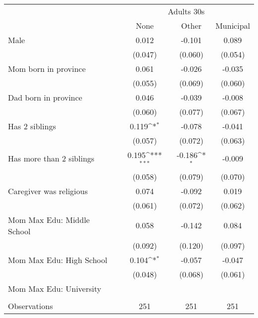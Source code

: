 {
\def\sym#1{\ifmmode^{#1}\else\(^{#1}\)\fi}
\begin{tabular}{l*{3}{c}}
\toprule
& \multicolumn{3}{c}{Adults 30s} \\
                    &\multicolumn{1}{c}{None}&\multicolumn{1}{c}{Other}&\multicolumn{1}{c}{Municipal}\\
\midrule
Male                &       0.012         &      -0.101         &       0.089         \\
                    &     (0.047)         &     (0.060)         &     (0.054)         \\
\addlinespace
Mom born in province&       0.061         &      -0.026         &      -0.035         \\
                    &     (0.055)         &     (0.069)         &     (0.060)         \\
\addlinespace
Dad born in province&       0.046         &      -0.039         &      -0.008         \\
                    &     (0.060)         &     (0.077)         &     (0.067)         \\
\addlinespace
Has 2 siblings      &       0.119\sym{*}  &      -0.078         &      -0.041         \\
                    &     (0.057)         &     (0.072)         &     (0.063)         \\
\addlinespace
Has more than 2 siblings&       0.195\sym{***}&      -0.186\sym{*}  &      -0.009         \\
                    &     (0.058)         &     (0.079)         &     (0.070)         \\
\addlinespace
Caregiver was religious&       0.074         &      -0.092         &       0.019         \\
                    &     (0.061)         &     (0.072)         &     (0.062)         \\
\addlinespace
Mom Max Edu: Middle School&       0.058         &      -0.142         &       0.084         \\
                    &     (0.092)         &     (0.120)         &     (0.097)         \\
\addlinespace
Mom Max Edu: High School&       0.104\sym{*}  &      -0.057         &      -0.047         \\
                    &     (0.048)         &     (0.068)         &     (0.061)         \\
\addlinespace
Mom Max Edu: University&               &              &               \\
                    &                 &                  &                 \\
\midrule
Observations        &         251         &         251         &         251         \\
\bottomrule
\end{tabular}
}
